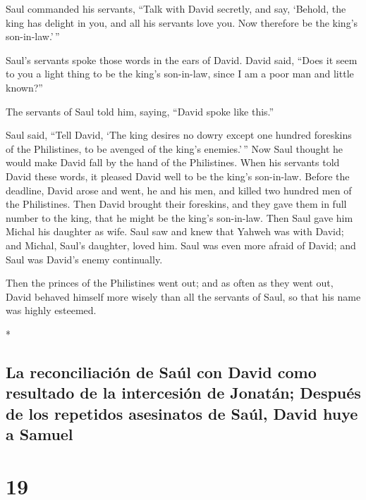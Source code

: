 \begin{paracol}{2}
\begin{otherlanguage}{english}
 Saul commanded his servants, ``Talk with David secretly,
and say, `Behold, the king has delight in you, and all his servants love
you. Now therefore be the king's son-in-law.'\,''

 Saul's servants spoke those words in the ears of David.
David said, ``Does it seem to you a light thing to be the king's
son-in-law, since I am a poor man and little known?''

 The servants of Saul told him, saying, ``David spoke
like this.''

 Saul said, ``Tell David, `The king desires no dowry
except one hundred foreskins of the Philistines, to be avenged of the
king's enemies.'\,'' Now Saul thought he would make David fall by the
hand of the Philistines.  When his servants told David
these words, it pleased David well to be the king's son-in-law. Before
the deadline,  David arose and went, he and his men, and
killed two hundred men of the Philistines. Then David brought their
foreskins, and they gave them in full number to the king, that he might
be the king's son-in-law. Then Saul gave him Michal his daughter as
wife.  Saul saw and knew that Yahweh was with David; and
Michal, Saul's daughter, loved him.  Saul was even more
afraid of David; and Saul was David's enemy continually.

 Then the princes of the Philistines went out; and as
often as they went out, David behaved himself more wisely than all the
servants of Saul, so that his name was highly esteemed.

\end{otherlanguage}

\switchcolumn[0]*

\hypertarget{la-reconciliaciuxf3n-de-sauxfal-con-david-como-resultado-de-la-intercesiuxf3n-de-jonatuxe1n-despuuxe9s-de-los-repetidos-asesinatos-de-sauxfal-david-huye-a-samuel}{%
\subsection{La reconciliación de Saúl con David como resultado de la
intercesión de Jonatán; Después de los repetidos asesinatos de Saúl,
David huye a
Samuel}\label{la-reconciliaciuxf3n-de-sauxfal-con-david-como-resultado-de-la-intercesiuxf3n-de-jonatuxe1n-despuuxe9s-de-los-repetidos-asesinatos-de-sauxfal-david-huye-a-samuel}}

\hypertarget{section-36}{%
\section{19}\label{section-36}}


\end{paracol}
